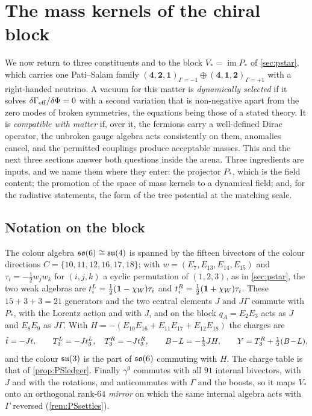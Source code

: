 \section{The mass kernels of the chiral block}
\label{sec:kernels}

We now return to three constituents and to the block $V_*=\operatorname{im}P_*$ of \cref{sec:pstar}, which carries one Pati--Salam family
$(\mathbf4,\mathbf2,\mathbf1)_{\Gamma=-1}\oplus(\mathbf4,\mathbf1,\mathbf2)_{\Gamma=+1}$ with a right-handed neutrino. A vacuum for this matter is
\emph{dynamically selected} if it solves $\delta\Gamma_{\rm eff}/\delta\Phi=0$ with a second variation that is non-negative apart from the zero modes
of broken symmetries, the equations being those of a stated theory. It is \emph{compatible with matter} if, over it, the fermions carry a
well-defined Dirac operator, the unbroken gauge algebra acts consistently on them, anomalies cancel, and the permitted couplings produce
acceptable masses. This and the next three sections answer both questions inside the arena. Three ingredients are inputs, and we name them
where they enter: the projector $P_*$, which is the field content; the promotion of the space of mass kernels to a dynamical field; and, for
the radiative statements, the form of the tree potential at the matching scale.

\subsection{Notation on the block}

The colour algebra $\mathfrak{so}(6)\cong\mathfrak{su}(4)$ is spanned by the fifteen bivectors of the colour directions $C=\{10,11,12,16,17,18\}$; with
$w=(E_7,E_{13},E_{14},E_{15})$ and $\tau_i=-\tfrac12w_jw_k$ for $(i,j,k)$ a cyclic permutation of $(1,2,3)$, as in \cref{sec:pstar},
the two weak algebras are $t^L_i=\tfrac12(\mathbf 1-\chi_W)\tau_i$ and
$t^R_i=\tfrac12(\mathbf 1+\chi_W)\tau_i$. These $15+3+3=21$ generators and the two central elements $J$ and $J\Gamma$ commute with $P_*$, with the
Lorentz action and with $J$, and on the block $q_A=E_2E_3$ acts as $J$ and $E_8E_9$ as $J\Gamma$. With $H=-(E_{10}E_{16}+E_{11}E_{17}+E_{12}E_{18})$
the charges are
\[
\hat t=-Jt,\qquad T^L_3=-Jt^L_3,\quad T^R_3=-Jt^R_3,\qquad B\!-\!L=-\tfrac13JH,\qquad Y=T^R_3+\tfrac12(B\!-\!L),
\]
and the colour $\mathfrak{su}(3)$ is the part of $\mathfrak{so}(6)$ commuting with $H$. The charge table is that of \cref{prop:PSledger}. Finally $\gamma^0$
commutes with all $91$ internal bivectors, with $J$ and with the rotations, and anticommutes with $\Gamma$ and the boosts, so it maps $V_*$
onto an orthogonal rank-$64$ \emph{mirror} on which the same internal algebra acts with $\Gamma$ reversed (\cref{rem:PSsettles}).

